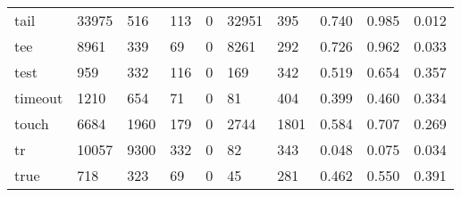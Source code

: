 \begin{longtable}{lp{1.3cm}p{1.3cm}p{1.3cm}p{1.3cm}p{1.3cm}p{1.3cm}p{1.3cm}p{1.3cm}p{1.3cm}}
tail      &                  33975 &                                516 &                               113 &                                0 &                             32951 &                             395 &                                0.740 &                                  0.985 &                                0.012 \\
tee       &                   8961 &                                339 &                                69 &                                0 &                              8261 &                             292 &                                0.726 &                                  0.962 &                                0.033 \\
test      &                    959 &                                332 &                               116 &                                0 &                               169 &                             342 &                                0.519 &                                  0.654 &                                0.357 \\
timeout   &                   1210 &                                654 &                                71 &                                0 &                                81 &                             404 &                                0.399 &                                  0.460 &                                0.334 \\
touch     &                   6684 &                               1960 &                               179 &                                0 &                              2744 &                            1801 &                                0.584 &                                  0.707 &                                0.269 \\
tr        &                  10057 &                               9300 &                               332 &                                0 &                                82 &                             343 &                                0.048 &                                  0.075 &                                0.034 \\
true      &                    718 &                                323 &                                69 &                                0 &                                45 &                             281 &                                0.462 &                                  0.550 &                                0.391 \\

\end{longtable}
